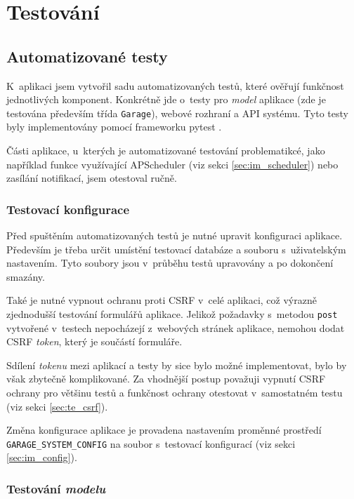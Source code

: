 \chapter{Testování}
\label{sec:te}

\section{Automatizované testy}

K~aplikaci jsem vytvořil sadu automatizovaných testů, které ověřují funkčnost jednotlivých komponent. Konkrétně jde o~testy pro \textit{model} aplikace (zde je testována především třída \texttt{Garage}), webové rozhraní a API systému. Tyto testy byly implementovány pomocí frameworku pytest \cite{pytest}.

Části aplikace, u~kterých je automatizované testování problematikcé, jako například funkce využívající APScheduler (viz sekci \ref{sec:im_scheduler}) nebo zasílání notifikací, jsem otestoval ručně.

\subsection{Testovací konfigurace}

Před spuštěním automatizovaných testů je nutné upravit konfiguraci aplikace. Především je třeba určit umístění testovací databáze a souboru s~uživatelským nastavením. Tyto soubory jsou v~průběhu testů upravovány a po dokončení smazány.

Také je nutné vypnout ochranu proti CSRF v~celé aplikaci, což výrazně zjednodušší testování formulářů aplikace. Jelikož požadavky s~metodou \texttt{post} vytvořené v~testech nepocházejí z~webových stránek aplikace, nemohou dodat CSRF \textit{token}, který je součástí formuláře. 

Sdílení \textit{tokenu} mezi aplikací a testy by sice bylo možné implementovat, bylo by však zbytečně komplikované. Za vhodnější postup považuji vypnutí CSRF ochrany pro většinu testů a funkčnost ochrany otestovat v~samostatném testu (viz sekci \ref{sec:te_csrf}).

Změna konfigurace aplikace je provadena nastavením proměnné prostředí \texttt{GARAGE\_SYSTEM\_CONFIG} na soubor s~testovací konfigurací (viz sekci \ref{sec:im_config}).

\subsection{Testování \textit{modelu}}
\label{sec:te_model}

